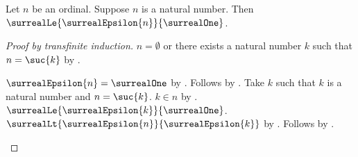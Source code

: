 \begin{lemma}\label{surreal_epsilon_at_most_one}
    Let $n$ be an ordinal.
    Suppose $n$ is a natural number.
    Then $\surrealLe{\surrealEpsilon{n}}{\surrealOne}$.
\end{lemma}
\begin{proof}[Proof by transfinite induction]
    $n=\emptyset$ or there exists a natural number $k$ such that
        $n=\suc{k}$ by .
    \begin{byCase}
            $\surrealEpsilon{n}=\surrealOne$
                by .
            Follows by
                .
            Take $k$ such that $k$ is a natural number and
                $n=\suc{k}$.
            $k\in n$ by .
            $\surrealLe{\surrealEpsilon{k}}{\surrealOne}$.
            $\surrealLt{\surrealEpsilon{n}}{\surrealEpsilon{k}}$
                by .
            Follows by
                .
    \end{byCase}
\end{proof}

